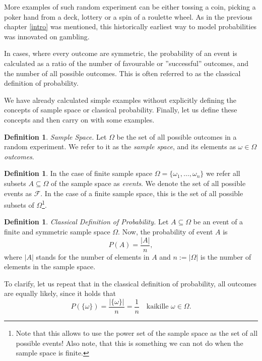 \documentclass[12pt,a4paper,leqno]{report}
\newcommand{\F}{\mathcal{F}}
\theoremstyle{plain}
\theoremstyle{definition}
\newtheorem{maar}[equation]{Definition}
\begin{document}
More examples of such random experiment can be either tossing a coin, picking a poker hand from a deck, lottery or a spin of a roulette wheel. As in the previous chapter \ref{intro} was mentioned, this historically earliest way to model probabilities was innovated on gambling.

In cases, where every outcome are symmetric, the probability of an event is calculated as a ratio of the number of favourable or ''successful'' outcomes, and the number of all possible outcomes. This is often referred to as the classical definition of probability.

We have already calculated simple examples without explicitly defining the concepts of sample space or classical probability. Finally, let us define these concepts and then carry on with some examples.

\begin{maar}\label{samplespace} \emph{Sample Space.} Let $\Omega$ be the set of all possible outcomes in a random experiment. We refer to it as the \emph{sample space},  and its elements as $\omega \in \Omega$ \emph{outcomes}. 
\end{maar}

\begin{maar}\label{maar:outcome}
In the case of finite sample space $\Omega = \{\omega_1, \dots, \omega_n\}$ we refer all subsets $A \subseteq \Omega$ of the sample space as \emph{events}. 
We denote the set of all possible events as $\F$. In the case of a finite sample space, this is the set of all possible subsets of $\Omega$\footnote{Note that this allows to use the power set of the sample space as the set of all possible events! Also note, that this is something we can not do when the sample space is finite.}.
\end{maar}

\begin{maar}
\label{maar:classprob}  
\emph{Classical Definition of Probability.} Let $A\subseteq \Omega$ be an event of a finite and symmetric sample space $\Omega$. Now, the probability of event $A$ is 
\[
P(A) = \frac{|A|}{n},
\]
where $|A|$ stands for the number of elements in $A$ and $n := |\Omega|$ is the number of elements in the sample space.  
\end{maar}

To clarify, let us repeat that in the classical definition of probability, all outcomes are equally likely, since it holds that
\[
P(\{\omega\}) = \frac{|\{\omega\}|}{n} = \frac{1}{n} \quad \text{kaikille} \,\, \omega \in \Omega.
\]
\end{document}
